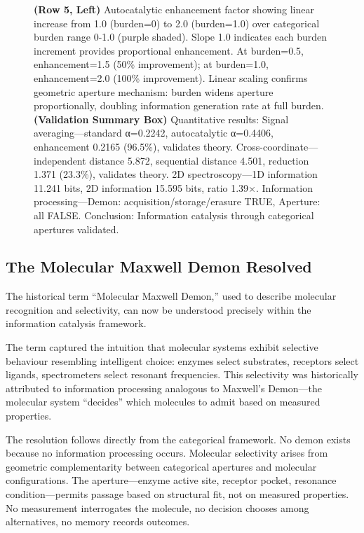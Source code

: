 \begin{figure}[htbp]
{    \textbf{(Row 5, Left)} Autocatalytic enhancement factor showing linear increase from 1.0 (burden=0) to 2.0 (burden=1.0) over categorical burden range 0-1.0 (purple shaded). Slope 1.0 indicates each burden increment provides proportional enhancement. At burden=0.5, enhancement=1.5 (50\% improvement); at burden=1.0, enhancement=2.0 (100\% improvement). Linear scaling confirms geometric aperture mechanism: burden widens aperture proportionally, doubling information generation rate at full burden. 
    \textbf{(Validation Summary Box)} Quantitative results: Signal averaging—standard α=0.2242, autocatalytic α=0.4406, enhancement 0.2165 (96.5\%), validates theory. Cross-coordinate—independent distance 5.872, sequential distance 4.501, reduction 1.371 (23.3\%), validates theory. 2D spectroscopy—1D information 11.241 bits, 2D information 15.595 bits, ratio 1.39×. Information processing—Demon: acquisition/storage/erasure TRUE, Aperture: all FALSE. Conclusion: Information catalysis through categorical apertures validated.}
    \label{fig:information_catalysis_validation}
\end{figure}

\subsection{The Molecular Maxwell Demon Resolved}

The historical term ``Molecular Maxwell Demon,'' used to describe molecular recognition and selectivity, can now be understood precisely within the information catalysis framework.

The term captured the intuition that molecular systems exhibit selective behaviour resembling intelligent choice: enzymes select substrates, receptors select ligands, spectrometers select resonant frequencies. This selectivity was historically attributed to information processing analogous to Maxwell's Demon—the molecular system ``decides'' which molecules to admit based on measured properties.

The resolution follows directly from the categorical framework. No demon exists because no information processing occurs. Molecular selectivity arises from geometric complementarity between categorical apertures and molecular configurations. The aperture—enzyme active site, receptor pocket, resonance condition—permits passage based on structural fit, not on measured properties. No measurement interrogates the molecule, no decision chooses among alternatives, no memory records outcomes.

